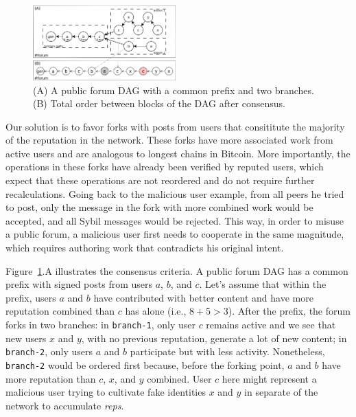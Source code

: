 \documentclass[10pt,journal,compsoc]{IEEEtran}
\newcommand{\reps}     {\emph{reps}\xspace}
\newcommand{\code}[1]  {\texttt{\footnotesize{#1}}}
\begin{document}
\begin{figure}
\centering
\includegraphics[width=0.49\textwidth]{reps2.png}
\caption{
    (A) A public forum DAG with a common prefix and two branches.
    (B) Total order between blocks of the DAG after consensus.
}
\label{fig.reps}
\end{figure}

Our solution is to favor forks with posts from users that consititute the
majority of the reputation in the network.
These forks have more associated work from active users and are analogous to
longest chains in Bitcoin.
More importantly, the operations in these forks have already been verified by
reputed users, which expect that these operations are not reordered and do not
require further recalculations.
Going back to the malicious user example, from all peers he tried to post, only
the message in the fork with more combined work would be accepted, and all
Sybil messages would be rejected.
This way, in order to misuse a public forum, a malicious user first needs to
cooperate in the same magnitude, which requires authoring work that contradicts
his original intent.

Figure~\ref{fig.reps}.A illustrates the consensus criteria.
A public forum DAG has a common prefix with signed posts from users $a$, $b$,
and $c$.
Let's assume that within the prefix, users $a$ and $b$ have contributed with
better content and have more reputation combined than $c$ has alone (i.e.,
$8+5>3$).
%
After the prefix, the forum forks in two branches:
in \code{branch-1}, only user $c$ remains active and we see that new users $x$
and $y$, with no previous reputation, generate a lot of new content;
in \code{branch-2}, only users $a$ and $b$ participate but with less activity.
Nonetheless, \code{branch-2} would be ordered first because, before the forking
point, $a$ and $b$ have more reputation than $c$, $x$, and $y$ combined.
%
User $c$ here might represent a malicious user trying to cultivate fake
identities $x$ and $y$ in separate of the network to accumulate \reps.
\end{document}
